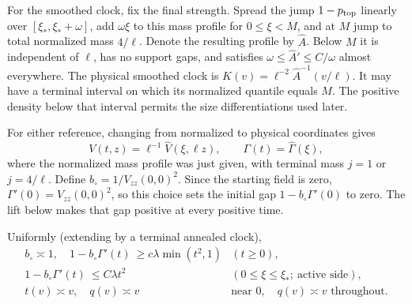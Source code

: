 For the smoothed clock, fix the final strength. Spread the jump
\(1-p_{\rm top}\) linearly over \([\xi_*,\xi_*+\omega]\), add
\(\omega\xi\) to this mass profile for \(0\le\xi<M\), and at
\(M\) jump to total normalized mass \(4/\ell\). Denote the resulting
profile by \(\widehat A\). Below \(M\) it is independent of
\(\ell\), has no support gaps, and satisfies
\(\omega\le\widehat A'\le C/\omega\) almost everywhere.
The physical smoothed clock is
\(K(v)=\ell^{-2}\widehat A^{-1}(v/\ell)\). It may have a terminal
interval on which its normalized quantile equals \(M\). The positive
density below that interval permits the size differentiations used later.

For either reference, changing from normalized to physical coordinates gives
\[
 V(t,z)=\ell^{-1}\widehat V(\xi,\ell z),\qquad
 \Gamma(t)=\widehat\Gamma(\xi),
\]
where the normalized mass profile was just given, with terminal mass \(j=1\) or \(j=4/\ell\). Define \(b_\circ=1/V_{zz}(0,0)^2\). Since the starting field is zero,
\(\Gamma'(0)=V_{zz}(0,0)^2\), so this choice sets the initial gap
\(1-b_\circ\Gamma'(0)\) to zero. The lift below makes that gap
positive at every positive time.

\begin{lemma}
\label{paths:lift}
Uniformly (extending by a terminal annealed clock),
\[
 \begin{array}{ll}
 b_\circ\asymp1,\quad
 1-b_\circ\Gamma'(t)\ \ge c\lambda\min(t^2,1)
     & (t\ge0),\\
 1-b_\circ\Gamma'(t)\ \le C\lambda t^2
     & (0\le \xi\le \xi_*;\ \text{active side}),\\
 t(v)\asymp v,\quad q(v)\asymp v
     & \text{near }0,\quad q(v)\asymp v\text{ throughout}.
 \end{array}                                                       \tag{P2}\label{eq:P2}
\]
\end{lemma}

